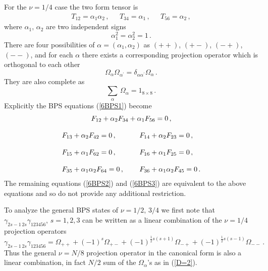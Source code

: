 \documentclass[a4paper,11pt]{article}
\newcommand{\const}{{\nu}}
\def\const{{\nu}}
\begin{document}
For the $\const=1/4$ case the  two form tensor is
\begin{equation}
\begin{array}{ccc}
T_{12} = \alpha_1\alpha_2\,,~~&~ T_{34}=\alpha_1\,,~~&~  T_{56} = \alpha_2\,,
\end{array}
\end{equation}
where  $\alpha_1,\,\alpha_2$ are two independent signs
\begin{equation}
\alpha_1^2=\alpha_2^2=1\,.
\end{equation}
There are four possibilities  of $\alpha=(\alpha_1,\alpha_2)$  as $(++)$, $(+-)$, $(-+)$, $(--)$, and for each $\alpha$ there exists a corresponding
projection operator which is orthogonal to each other
\begin{equation}
\Omega_{\alpha}\Omega_{\alpha^{\prime}}=\delta_{\alpha\alpha^{\prime}}\Omega_{\alpha}\,.
\end{equation}
They are also complete as
\begin{equation}
\displaystyle{\sum_{\alpha}}\,\Omega_{\alpha}=1_{8\times 8}\,.
\end{equation}
Explicitly the BPS equations (\ref{6BPS1}) become
\begin{equation}
\begin{array}{ll}
\multicolumn{2}{c}{F_{12}+\alpha_{2}F_{34}+\alpha_{1}F_{56}=0\,,}\\ ~{}&{}\\
F_{13}+\alpha_{2}F_{42}=0\,,~~&~~F_{14}+\alpha_{2}F_{23}=0\,,\\ {}&{}\\
F_{15}+\alpha_{1}F_{62}=0\,,~~&~~F_{16}+\alpha_{1}F_{25}=0\,,\\ {}&{}\\
F_{35}+\alpha_{1}\alpha_{2}F_{64}=0\,,~~&~~F_{36}+\alpha_{1}\alpha_{2}F_{45}=0\,.
\end{array}
\label{6BPS}
\end{equation}
The remaining equations (\ref{6BPS2}) and (\ref{6BPS3}) are equivalent to the above equations and so do not provide any additional restriction.



To analyze the general BPS states  of $\nu=1/2,\,3/4$  we first note that $\gamma_{{\scriptscriptstyle 2}s{\scriptscriptstyle
-}\!{\scriptscriptstyle 1}\,{\scriptscriptstyle 2}s}\gamma_{123456}$, $s=1,2,3$ can be written as a linear combination of the $\nu=1/4$ projection
operators
\begin{equation}
\gamma_{{\scriptscriptstyle 2}s{\scriptscriptstyle -}\!{\scriptscriptstyle 1}\,{\scriptscriptstyle 2}s}\gamma_{123456}=\Omega_{{\scriptscriptstyle ++}}
+(-1)^{s}\Omega_{{\scriptscriptstyle +-}}+(-1)^{\frac{1}{2}s(s+1)}\Omega_{{\scriptscriptstyle -+}}+(-1)^{\frac{1}{2}s(s-1)}\Omega_{{\scriptscriptstyle --}}\,.
\end{equation}
Thus the general  $\const=N/8$  projection operator   in the  canonical form is also a linear combination, in fact  $N/2$ sum of the
$\Omega_{\alpha}$'s as in (\ref{D=2}).
\end{document}
